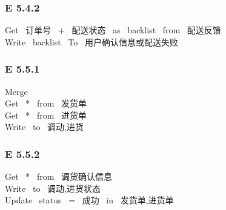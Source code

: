 \documentclass{article}
\begin{document}
\begin{CJK*}{UTF8}{gbsn}
\subsubsection*{E 5.4.2}
Get \ 订单号 \ + \ 配送状态 \ as \ backlist \ from \ 配送反馈 \\ 
Write \ backlist \ To \ 用户确认信息或配送失败\\ 
\vspace{-1mm}
\subsubsection*{E 5.5.1}
Merge\\ 
Get \ * \ from \ 发货单 \\ 
Get \ * \ from \ 进货单 \\ 
Write \ to \ 调动,进货\\ 
\vspace{-1mm}
\subsubsection*{E 5.5.2}
Get \ * \ from \ 调货确认信息\\ 
Write \ to \ 调动,进货状态\\ 
Update \ status \ = \ 成功 \ in \ 发货单,进货单\\ 
\vspace{-1mm}
\end{CJK*}
\end{document}
